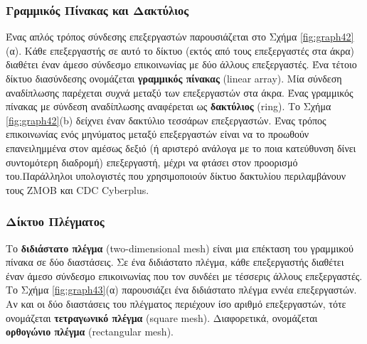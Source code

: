 \documentclass[12pt,a4paper]{article}
\begin{document}
\subsubsection*{Γραμμικός Πίνακας και Δακτύλιος}
Ένας απλός τρόπος σύνδεσης επεξεργαστών παρουσιάζεται στο Σχήμα \ref{fig:graph42}(α). 
Κάθε επεξεργαστής σε αυτό το δίκτυο (εκτός από τους επεξεργαστές στα άκρα) 
διαθέτει έναν άμεσο σύνδεσμο επικοινωνίας με δύο άλλους επεξεργαστές. 
Ένα τέτοιο δίκτυο διασύνδεσης ονομάζεται \textbf{γραμμικός πίνακας} 
(\foreignlanguage{english}{linear array}). Μία σύνδεση αναδίπλωσης παρέχεται 
συχνά μεταξύ των επεξεργαστών στα άκρα. 
Ένας γραμμικός πίνακας με σύνδεση αναδίπλωσης αναφέρεται ως \textbf{δακτύλιος} 
(\foreignlanguage{english}{ring}). Το Σχήμα \ref{fig:graph42}(b) δείχνει 
έναν δακτύλιο τεσσάρων επεξεργαστών. Ένας τρόπος επικοινωνίας ενός μηνύματος 
μεταξύ επεξεργαστών είναι να το προωθούν επανειλημμένα στον αμέσως δεξιό 
(ή αριστερό ανάλογα με το ποια κατεύθυνση δίνει συντομότερη διαδρομή) 
επεξεργαστή, μέχρι να φτάσει στον προορισμό του.Παράλληλοι υπολογιστές 
που χρησιμοποιούν δίκτυο δακτυλίου περιλαμβάνουν τους 
\foreignlanguage{english}{ZMOB} και \foreignlanguage{english}{CDC Cyberplus}.

\subsubsection*{Δίκτυο Πλέγματος}
Το \textbf{διδιάστατο πλέγμα} (\foreignlanguage{english}{two-dimensional mesh}) 
είναι μια επέκταση του γραμμικού πίνακα σε δύο διαστάσεις. Σε ένα 
διδιάστατο πλέγμα, κάθε επεξεργαστής διαθέτει έναν άμεσο σύνδεσμο 
επικοινωνίας που τον συνδέει με τέσσερις άλλους επεξεργαστές. Το Σχήμα 
\ref{fig:graph43}(α) παρουσιάζει ένα διδιάστατο πλέγμα εννέα επεξεργαστών. 
Αν και οι δύο διαστάσεις του πλέγματος περιέχουν ίσο αριθμό επεξεργαστών, 
τότε ονομάζεται \textbf{τετραγωνικό πλέγμα} (\foreignlanguage{english}{square mesh}). 
Διαφορετικά, ονομάζεται \textbf{ορθογώνιο πλέγμα}
(\foreignlanguage{english}{rectangular mesh}).
\end{document}
